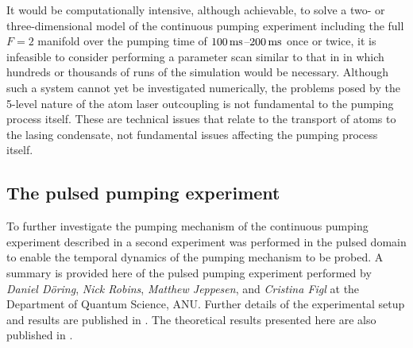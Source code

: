 It would be computationally intensive, although achievable, to solve a two- or three-dimensional model of the continuous pumping experiment including the full $F=2$ manifold over the pumping time of $\unit[100]{ms}$--$\unit[200]{ms}$ once or twice, it is infeasible to consider performing a parameter scan similar to that in  in which hundreds or thousands of runs of the simulation would be necessary.  Although such a system cannot yet be investigated numerically, the problems posed by the 5-level nature of the atom laser outcoupling is not fundamental to the pumping process itself.  These are technical issues that relate to the transport of atoms to the lasing condensate, not fundamental issues affecting the pumping process itself.


\subsection{The pulsed pumping experiment}
\label{OpticalPumping:PulsedPumpingExperiment}

To further investigate the pumping mechanism of the continuous pumping experiment described in  a second experiment was performed in the pulsed domain to enable the temporal dynamics of the pumping mechanism to be probed.  A summary is provided here of the pulsed pumping experiment performed by \emph{Daniel Döring}, \emph{Nick Robins}, \emph{Matthew Jeppesen}, and \emph{Cristina Figl} at the Department of Quantum Science, ANU.  Further details of the experimental setup and results are published in \citep{Doring:2009}.  The theoretical results presented here are also published in \citep{Doring:2009}.

\parasep


